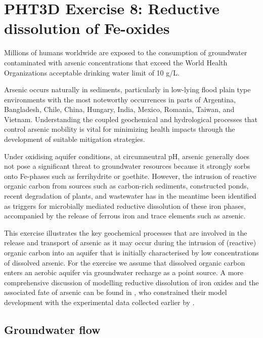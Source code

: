 \section[PHT3D Exercise 8: Reductive dissolution of Fe-oxides]{PHT3D Exercise 8: Reductive dissolution of Fe-oxides}

Millions of humans worldwide are exposed to the consumption
of groundwater contaminated with arsenic concentrations that
exceed the World Health Organizations acceptable drinking
water limit of 10 \micro g/L. 

Arsenic occurs naturally in sediments, particularly in low-lying flood plain type environments with the most noteworthy occurrences in parts of Argentina, Bangladesh, Chile, China, Hungary, India, Mexico, Romania, Taiwan, and Vietnam. Understanding the coupled geochemical and hydrological processes that control arsenic mobility is vital for minimizing health impacts through the development of suitable mitigation strategies. 

Under oxidising aquifer conditions, at circumneutral pH, arsenic generally does not pose
a significant threat to groundwater resources because it strongly
sorbs onto Fe-phases such as ferrihydrite or goethite. 
However, the intrusion of reactive organic carbon from sources such as
carbon-rich sediments, constructed ponds, recent degradation
of plants, and wastewater has in the meantime been
identified as triggers for microbially mediated reductive
dissolution of these iron phases, accompanied by the release
of ferrous iron and trace elements such as arsenic.

This exercise illustrates the key geochemical processes that are involved in the
release and transport of arsenic as it may occur 
during the intrusion of (reactive) organic carbon into an aquifer that is initially characterised by low concentrations of dissolved arsenic.
For the exercise we assume that dissolved organic carbon enters an aerobic aquifer via groundwater 
recharge as a point source. A more comprehensive discussion of modelling reductive dissolution of iron oxides and the associated fate of arsenic can be found in \cite{Rawson20162459}, who constrained their model development with the experimental data collected earlier by \cite{Tufano20084777}.  


\subsection[Groundwater flow]{Groundwater flow}

